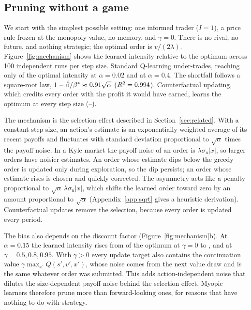 \subsection{Pruning without a game}
\label{sec:mechanism}

We start with the simplest possible setting: one informed trader ($I=1$), a
price rule frozen at the monopoly value, no memory, and $\gamma=0$. There is no
rival, no future, and nothing strategic; the optimal order is $v/(2\lambda)$.
Figure~\ref{fig:mechanism} shows the learned intensity relative to the optimum
across 100 independent runs per step size. Standard Q-learning under-trades,
reaching only \MechTakenA{} of the optimal intensity at $\alpha=0.02$ and
\MechTakenE{} at $\alpha=0.4$. The shortfall follows a square-root law,
$1-\hat\beta/\beta^\ast\approx0.91\sqrt\alpha$ ($R^2=0.994$).
Counterfactual updating, which credits every order with the profit it would
have earned, learns the optimum at every step size
(\MechCfA--\MechCfE).

The mechanism is the selection effect described in Section~\ref{sec:related}.
With a constant step size, an action's estimate is an exponentially weighted
average of its recent payoffs and fluctuates with standard deviation
proportional to $\sqrt{\alpha}$ times the payoff noise. In a Kyle market the
payoff noise of an order is $\lambda\sigma_u|x|$, so larger orders have noisier
estimates. An order whose estimate dips below the greedy order is updated only
during exploration, so the dip persists; an order whose estimate rises is
chosen and quickly corrected. The asymmetry acts like a penalty proportional
to $\sqrt\alpha\,\lambda\sigma_u|x|$, which shifts the learned order toward
zero by an amount proportional to $\sqrt\alpha$ (Appendix~\ref{app:sqrt}
gives a heuristic derivation). Counterfactual updates remove
the selection, because every order is updated every period.

The bias also depends on the discount factor (Figure~\ref{fig:mechanism}b).
At $\alpha=0.15$ the learned intensity rises from \MechGammaA{} of the optimum
at $\gamma=0$ to \MechGammaB{}, \MechGammaC{} and \MechGammaD{} at
$\gamma=0.5,0.8,0.95$. With $\gamma>0$ every update target also contains the
continuation value $\gamma\max_{x'}Q(s',v',x')$, whose noise comes from the next
value draw and is the same whatever order was submitted. This adds
action-independent noise that dilutes the size-dependent payoff noise behind the
selection effect. Myopic learners therefore prune more than forward-looking ones,
for reasons that have nothing to do with strategy.

